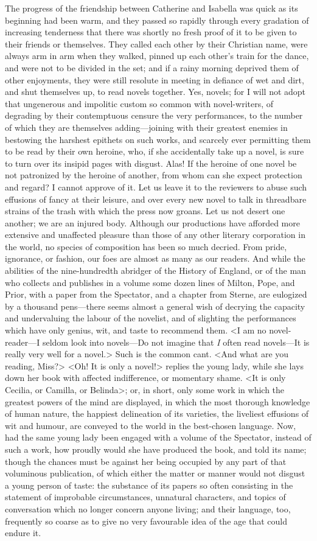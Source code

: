  The progress of the friendship between Catherine and Isabella was quick as its beginning had been warm, and they passed so rapidly through every gradation of increasing tenderness that there was shortly no fresh proof of it to be given to their friends or themselves. They called each other by their Christian name, were always arm in arm when they walked, pinned up each other's train for the dance, and were not to be divided in the set; and if a rainy morning deprived them of other enjoyments, they were still resolute in meeting in defiance of wet and dirt, and shut themselves up, to read novels together. Yes, novels; for I will not adopt that ungenerous and impolitic custom so common with novel-writers, of degrading by their contemptuous censure the very performances, to the number of which they are themselves adding—joining with their greatest enemies in bestowing the harshest epithets on such works, and scarcely ever permitting them to be read by their own heroine, who, if she accidentally take up a novel, is sure to turn over its insipid pages with disgust. Alas! If the heroine of one novel be not patronized by the heroine of another, from whom can she expect protection and regard? I cannot approve of it. Let us leave it to the reviewers to abuse such effusions of fancy at their leisure, and over every new novel to talk in threadbare strains of the trash with which the press now groans. Let us not desert one another; we are an injured body. Although our productions have afforded more extensive and unaffected pleasure than those of any other literary corporation in the world, no species of composition has been so much decried. From pride, ignorance, or fashion, our foes are almost as many as our readers. And while the abilities of the nine-hundredth abridger of the History of England, or of the man who collects and publishes in a volume some dozen lines of Milton, Pope, and Prior, with a paper from the Spectator, and a chapter from Sterne, are eulogized by a thousand pens—there seems almost a general wish of decrying the capacity and undervaluing the labour of the novelist, and of slighting the performances which have only genius, wit, and taste to recommend them. <I am no novel-reader—I seldom look into novels—Do not imagine that \textit{I} often read novels—It is really very well for a novel.> Such is the common cant. <And what are you reading, Miss\doubleemdash?> <Oh! It is only a novel!> replies the young lady, while she lays down her book with affected indifference, or momentary shame. <It is only Cecilia, or Camilla, or Belinda>; or, in short, only some work in which the greatest powers of the mind are displayed, in which the most thorough knowledge of human nature, the happiest delineation of its varieties, the liveliest effusions of wit and humour, are conveyed to the world in the best-chosen language. Now, had the same young lady been engaged with a volume of the Spectator, instead of such a work, how proudly would she have produced the book, and told its name; though the chances must be against her being occupied by any part of that voluminous publication, of which either the matter or manner would not disgust a young person of taste: the substance of its papers so often consisting in the statement of improbable circumstances, unnatural characters, and topics of conversation which no longer concern anyone living; and their language, too, frequently so coarse as to give no very favourable idea of the age that could endure it. 